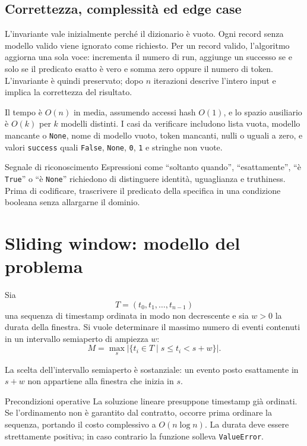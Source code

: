\subsection{Correttezza, complessità ed edge case}

L'invariante vale inizialmente perché il dizionario è vuoto. Ogni record senza
modello valido viene ignorato come richiesto. Per un record valido,
l'algoritmo aggiorna una sola voce: incrementa il numero di run, aggiunge un
successo se e solo se il predicato esatto è vero e somma zero oppure il numero
di token. L'invariante è quindi preservato; dopo $n$ iterazioni descrive
l'intero input e implica la correttezza del risultato.

Il tempo è $O(n)$ in media, assumendo accessi hash $O(1)$, e lo spazio
ausiliario è $O(k)$ per $k$ modelli distinti. I casi da verificare includono
lista vuota, modello mancante o \texttt{None}, nome di modello vuoto, token
mancanti, nulli o uguali a zero, e valori \texttt{success} quali
\texttt{False}, \texttt{None}, \texttt{0}, \texttt{1} e stringhe non vuote.

\begin{principlebox}{Segnale di riconoscimento}
Espressioni come ``soltanto quando'', ``esattamente'', ``è \texttt{True}'' o
``è \texttt{None}'' richiedono di distinguere identità, uguaglianza e
truthiness. Prima di codificare, trascrivere il predicato della specifica in
una condizione booleana senza allargarne il dominio.
\end{principlebox}

\section{Sliding window: modello del problema}

Sia
\[
T = (t_0,t_1,\ldots,t_{n-1})
\]
una sequenza di timestamp ordinata in modo non decrescente e sia $w>0$ la
durata della finestra. Si vuole determinare il massimo numero di eventi
contenuti in un intervallo semiaperto di ampiezza $w$:
\[
M = \max_{s}\left|\{t_i \in T \mid s \leq t_i < s+w\}\right|.
\]

La scelta dell'intervallo semiaperto è sostanziale: un evento posto
esattamente in $s+w$ non appartiene alla finestra che inizia in $s$.

\begin{definitionbox}{Precondizioni operative}
La soluzione lineare presuppone timestamp già ordinati. Se l'ordinamento non
è garantito dal contratto, occorre prima ordinare la sequenza, portando il
costo complessivo a $O(n\log n)$. La durata deve essere strettamente positiva;
in caso contrario la funzione solleva \texttt{ValueError}.
\end{definitionbox}

